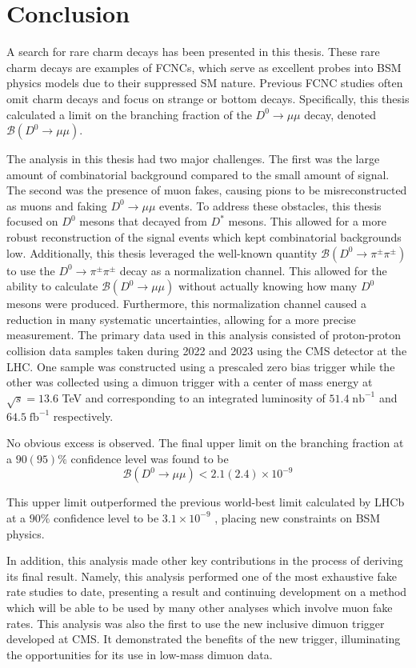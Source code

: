 \chapter{Conclusion}
\label{ch:5}

\vspace{-5mm}

A search for rare charm decays has been presented in this thesis. These rare charm decays are examples of FCNCs, which serve as excellent probes into BSM physics models due to their suppressed SM nature. Previous FCNC studies often omit charm decays and focus on strange or bottom decays. Specifically, this thesis calculated a limit on the branching fraction of the $D^0 \to \mu \mu$ decay, denoted $\mathcal{B}(D^0 \to \mu \mu)$. 

The analysis in this thesis had two major challenges. The first was the large amount of combinatorial background compared to the small amount of signal. The second was the presence of muon fakes, causing pions to be misreconstructed as muons and faking $D^0 \to \mu \mu$ events. To address these obstacles, this thesis focused on $D^0$ mesons that decayed from $D^*$ mesons. This allowed for a more robust reconstruction of the signal events which kept combinatorial backgrounds low. Additionally, this thesis leveraged the well-known quantity $\mathcal{B}(D^0 \to \pi^\pm \pi^\pm)$ to use the $D^0 \to \pi^\pm \pi^\pm$ decay as a normalization channel. This allowed for the ability to calculate $\mathcal{B}(D^0 \to \mu \mu)$ without actually knowing how many $D^0$ mesons were produced. Furthermore, this normalization channel caused a reduction in many systematic uncertainties, allowing for a more precise measurement. The primary data used in this analysis consisted of proton-proton collision data samples taken during 2022 and 2023 using the CMS detector at the LHC. One sample was constructed using a prescaled zero bias trigger while the other was collected using a dimuon trigger with a center of mass energy at $\sqrt{s} = 13.6$ TeV and corresponding to an integrated luminosity of $51.4\; \text{nb}^{-1}$ and $64.5\; \text{fb}^{-1}$ respectively. 

No obvious excess is observed. The final upper limit on the branching fraction at a $90(95)\%$ confidence level was found to be 
\begin{equation}
    \mathcal{B}(D^0 \to \mu \mu) < 2.1(2.4) \times 10^{-9} 
\end{equation} 

This upper limit outperformed the previous world-best limit calculated by LHCb at a $90\%$ confidence level to be $3.1 \times 10^{-9}$ \cite{ref:lhcb_2023}, placing new constraints on BSM physics.

In addition, this analysis made other key contributions in the process of deriving its final result. Namely, this analysis performed one of the most exhaustive fake rate studies to date, presenting a result and continuing development on a method which will be able to be used by many other analyses which involve muon fake rates. This analysis was also the first to use the new inclusive dimuon trigger developed at CMS. It demonstrated the benefits of the new trigger, illuminating the opportunities for its use in low-mass dimuon data. 